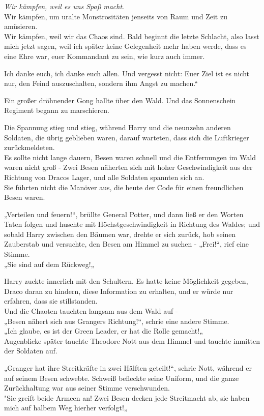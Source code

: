 {\emph{Wir kämpfen, weil es uns Spaß macht}.\\ Wir kämpfen, um uralte Monstrositäten jenseits von Raum und Zeit zu amüsieren.\\ Wir kämpfen, weil wir das Chaos sind. Bald beginnt die letzte Schlacht, also lasst mich jetzt sagen, weil ich später keine Gelegenheit mehr haben werde, dass es eine Ehre war, euer Kommandant zu sein, wie kurz auch immer.

Ich danke euch, ich danke euch allen. Und vergesst nicht: Euer Ziel ist es nicht nur, den Feind auszuschalten, sondern ihm Angst zu machen.“

Ein großer dröhnender Gong hallte über den Wald. Und das Sonnenschein Regiment begann zu marschieren.

Die Spannung stieg und stieg, während Harry und die neunzehn anderen Soldaten, die übrig geblieben waren, darauf warteten, dass sich die Luftkrieger zurückmeldeten.\\ Es sollte nicht lange dauern, Besen waren schnell und die Entfernungen im Wald waren nicht groß - Zwei Besen näherten sich mit hoher Geschwindigkeit aus der Richtung von Dracos Lager, und alle Soldaten spannten sich an.\\ Sie führten nicht die Manöver aus, die heute der Code für einen freundlichen Besen waren.

„Verteilen und feuern!“, brüllte General Potter, und dann ließ er den Worten Taten folgen und huschte mit Höchstgeschwindigkeit in Richtung des Waldes; und sobald Harry zwischen den Bäumen war, drehte er sich zurück, hob seinen Zauberstab und versuchte, den Besen am Himmel zu suchen - „Frei!“, rief eine Stimme.\\ „Sie sind auf dem Rückweg!„

Harry zuckte innerlich mit den Schultern. Es hatte keine Möglichkeit gegeben, Draco daran zu hindern, diese Information zu erhalten, und er würde nur erfahren, dass sie stillstanden.\\ Und die Chaoten tauchten langsam aus dem Wald auf -\\ „Besen nähert sich aus Grangers Richtung!“, schrie eine andere Stimme.\\ „Ich glaube, es ist der Green Leader, er hat die Rolle gemacht!„\\ Augenblicke später tauchte Theodore Nott aus dem Himmel und tauchte inmitten der Soldaten auf.

„Granger hat ihre Streitkräfte in zwei Hälften geteilt!“, schrie Nott, während er auf seinem Besen schwebte. Schweiß befleckte seine Uniform, und die ganze Zurückhaltung war aus seiner Stimme verschwunden.\\ "Sie greift beide Armeen an! Zwei Besen decken jede Streitmacht ab, sie haben mich auf halbem Weg hierher verfolgt!„

}
